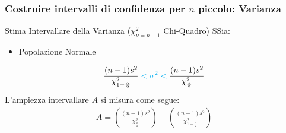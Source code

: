 \documentclass{article}  %
\theoremstyle{definition}
\begin{document}
\subsubsection{Costruire intervalli di confidenza per $n$ piccolo: Varianza}
\begin{theorem}{Stima Intervallare della Varianza ($\chi^2_{\nu=n-1}$ Chi-Quadro)}
	SSia:
	\begin{itemize}
		\item Popolazione Normale
	\end{itemize}
	\begin{align*}
		\frac{(n-1)s^2}{\chi^2_{1- \frac{\alpha}{2}}} \textcolor{cyan}{\; < \sigma^2 < \;} \frac{(n-1)s^2}{\chi^2_{\frac{\alpha}{2}}}
	\end{align*}
	L'ampiezza intervallare $A$ si misura come segue:
	\begin{align*}
		A = \left(\frac{(n-1)s^2}{\chi^2_{\frac{\alpha}{2}}}\right) - \left(\frac{(n-1)s^2}{\chi^2_{1- \frac{\alpha}{2}}}\right)
	\end{align*}
\end{theorem}
\end{document}
